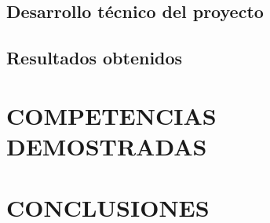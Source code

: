 \subsection{Desarrollo técnico del proyecto}



\subsection{Resultados obtenidos}


\newpage
\section{COMPETENCIAS DEMOSTRADAS}

\newpage
\section{CONCLUSIONES}
